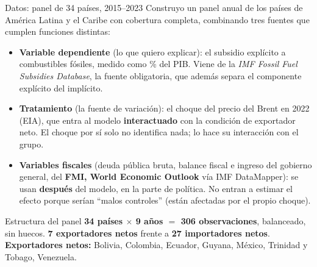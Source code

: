 \documentclass[aspectratio=169,10pt]{beamer}
\newcommand{\key}[1]{{\bfseries\color{AcentoRojo}#1}}
\begin{document}
\begin{frame}{Datos: panel de 34 países, 2015--2023}
  \small
  Construyo un panel anual de los países de América Latina y el Caribe con cobertura completa,
  combinando tres fuentes que cumplen funciones distintas:
  \begin{itemize}
    \item \textbf{Variable dependiente} (lo que quiero explicar): el subsidio explícito a
          combustibles fósiles, medido como \% del PIB. Viene de la \emph{IMF Fossil Fuel
          Subsidies Database}, la fuente obligatoria, que además separa el componente explícito
          del implícito.
    \item \textbf{Tratamiento} (la fuente de variación): el choque del precio del Brent en 2022
          (EIA), que entra al modelo \textbf{interactuado} con la condición de exportador neto.
          El choque por sí solo no identifica nada; lo hace su interacción con el grupo.
    \item \textbf{Variables fiscales} (deuda pública bruta, balance fiscal e ingreso del
          gobierno general, del \textbf{FMI, World Economic Outlook} vía IMF DataMapper): se usan
          \textbf{después} del modelo, en la parte de política. No entran a estimar el efecto
          porque serían ``malos controles'' (están afectadas por el propio choque).
  \end{itemize}

  \begin{block}{Estructura del panel}
    \key{34 países $\times$ 9 años $=$ 306 observaciones}, balanceado, sin huecos.
    \textbf{7 exportadores netos} frente a \textbf{27 importadores netos}.\\[0.3em]
    \textbf{Exportadores netos:} Bolivia, Colombia, Ecuador, Guyana, México, Trinidad y Tobago,
    Venezuela.
  \end{block}

\end{frame}
\end{document}
